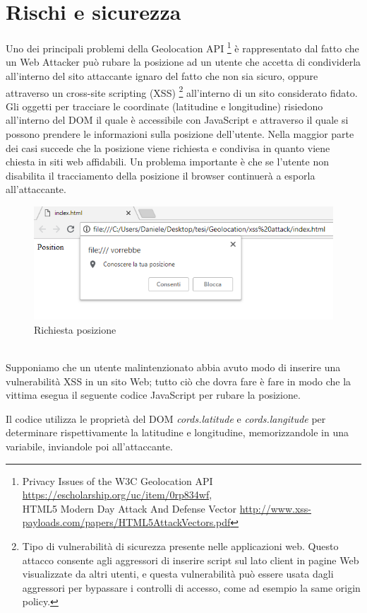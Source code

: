 \documentclass[11pt ,a4paper , twoside , openright ]{book}
\begin{document}
	\section{Rischi e sicurezza} 
	Uno dei principali problemi della Geolocation API \footnote{Privacy Issues of the W3C Geolocation API \url{https://escholarship.org/uc/item/0rp834wf}, \\ HTML5 Modern Day Attack And Defense Vector  \url{http://www.xss-payloads.com/papers/HTML5AttackVectors.pdf}} è rappresentato dal fatto che un Web Attacker può rubare la posizione ad un utente che accetta di condividerla all'interno del sito attaccante ignaro del fatto che non sia sicuro, oppure attraverso un cross-site scripting (XSS) \footnote{Tipo di vulnerabilità di sicurezza presente nelle applicazioni web. Questo attacco consente agli aggressori di inserire script sul lato client in pagine Web visualizzate da altri utenti, e questa vulnerabilità può essere usata dagli aggressori per bypassare i controlli di accesso, come ad esempio la same origin policy.} all'interno di un sito considerato fidato. Gli oggetti per tracciare le coordinate (latitudine e longitudine) risiedono all'interno del DOM il quale è accessibile con JavaScript e attraverso il quale si possono prendere le informazioni sulla posizione dell'utente. 
	Nella maggior parte dei casi succede che la posizione viene richiesta e condivisa in quanto viene chiesta in siti web affidabili.
	Un problema importante è che se l'utente non disabilita il tracciamento della posizione il browser continuerà a esporla all'attaccante.
	\begin{figure}[h]
		\centering
		\includegraphics[width=0.5\linewidth]{pos1}
		\caption{Richiesta posizione}
		\label{fig: Richiesta posizione}
	\end{figure}
	\pagebreak
	\\
	Supponiamo che un utente malintenzionato abbia avuto modo di inserire una vulnerabilità XSS in un sito Web; tutto ciò che dovra fare è fare in modo che la vittima esegua il seguente codice JavaScript per rubare la posizione.
	
	Il codice utilizza le proprietà del DOM \textit{cords.latitude} e \textit{cords.langitude} per determinare rispettivamente la latitudine e longitudine, memorizzandole in una variabile, inviandole poi all'attaccante. 
	\\
\end{document}
